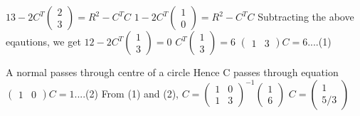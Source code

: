 \documentclass{beamer}
\begin{document}
\begin{frame}\center

$13 - 2C^T\begin{pmatrix}
2\\
3\end{pmatrix} = R^2 - C^TC$
\linebreak
\linebreak $1 - 2C^T\begin{pmatrix}
1\\
0\end{pmatrix} = R^2 - C^TC$
\linebreak
\linebreak Subtracting the above eqautions, we get
\linebreak $12 - 2C^T\begin{pmatrix}
1\\
3\end{pmatrix} = 0$
\linebreak $C^T\begin{pmatrix}
1\\
3\end{pmatrix} = 6$
\linebreak
\linebreak $ \begin{pmatrix} 
1 & 3\end{pmatrix} C = 6 $....(1)
 

\end{frame}

\begin{frame}\center

A normal passes through centre of a circle
\linebreak Hence C passes through equation
\linebreak
\linebreak $\begin{pmatrix}
1 & 0\end{pmatrix} C = 1 $....(2)
\linebreak
\linebreak From (1) and (2), 
\linebreak
\linebreak $ C = \begin{pmatrix}
1 & 0\\
1 & 3\end{pmatrix}^{-1} \begin{pmatrix}
1\\
6\end{pmatrix}$
\linebreak
\linebreak $ C = \begin{pmatrix}
1\\
5/3\end{pmatrix} $


\end{frame}
\end{document}
